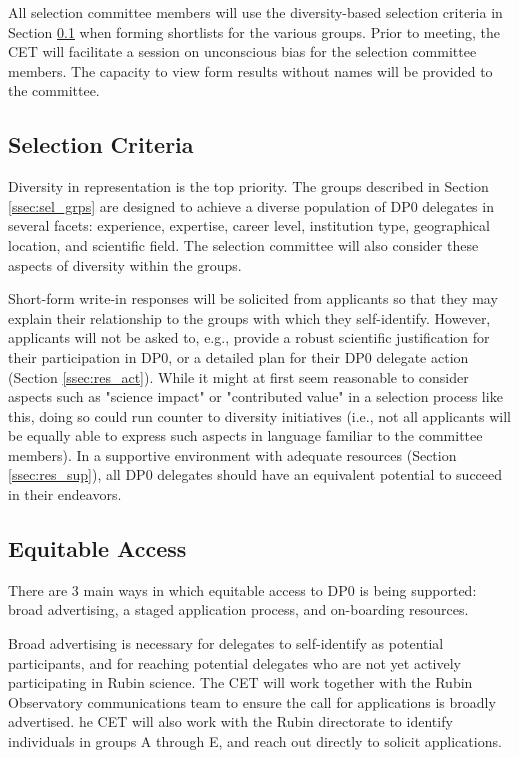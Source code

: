 \documentclass[DM,lsstdraft,authoryear,toc]{lsstdoc}
\begin{document}
All selection committee members will use the diversity-based selection criteria in Section \ref{ssec:sel_crit} when forming shortlists for the various groups.
Prior to meeting, the CET will facilitate a session on unconscious bias for the selection committee members.
The capacity to view form results without names will be provided to the committee.

\subsection{Selection Criteria}\label{ssec:sel_crit}

Diversity in representation is the top priority.
The groups described in Section \ref{ssec:sel_grps} are designed to achieve a diverse population of DP0 delegates in several facets: experience, expertise, career level, institution type, geographical location, and scientific field.
The selection committee will also consider these aspects of diversity within the groups.

Short-form write-in responses will be solicited from applicants so that they may explain their relationship to the groups with which they self-identify.
However, applicants will not be asked to, e.g., provide a robust scientific justification for their participation in DP0, or a detailed plan for their DP0 delegate action (Section \ref{ssec:res_act}).
While it might at first seem reasonable to consider aspects such as "science impact" or "contributed value" in a selection process like this, doing so could run counter to diversity initiatives (i.e., not all applicants will be equally able to express such aspects in language familiar to the committee members).
In a supportive environment with adequate resources (Section \ref{ssec:res_sup}), all DP0 delegates should have an equivalent potential to succeed in their endeavors.

\subsection{Equitable Access}\label{ssec:sel_equity}

There are 3 main ways in which equitable access to DP0 is being supported: broad advertising, a staged application process, and on-boarding resources.

Broad advertising is necessary for delegates to self-identify as potential participants, and for reaching potential delegates who are not yet actively participating in Rubin science.
The CET will work together with the Rubin Observatory communications team to ensure the call for applications is broadly advertised. 
he CET will also work with the Rubin directorate to identify individuals in groups A through E, and reach out directly to solicit applications. 
\end{document}
